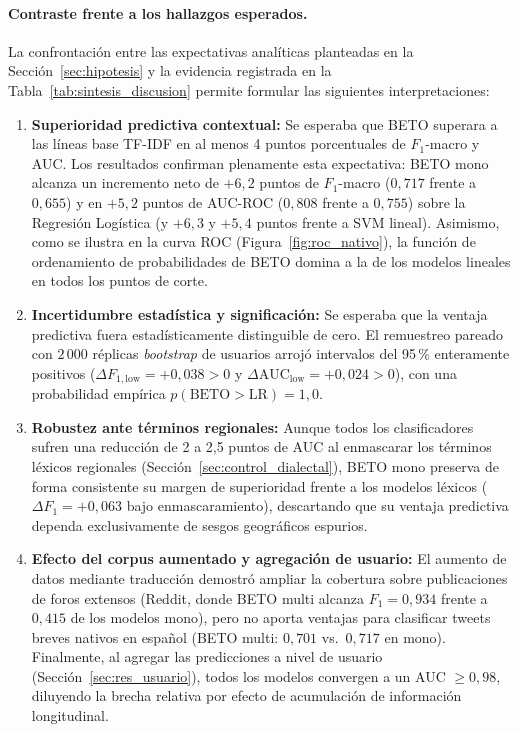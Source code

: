 \documentclass[12pt,a4paper]{article}
\begin{document}
\paragraph{Contraste frente a los hallazgos esperados.}
La confrontación entre las expectativas analíticas planteadas en la Sección~\ref{sec:hipotesis} y la evidencia registrada en la Tabla~\ref{tab:sintesis_discusion} permite formular las siguientes interpretaciones:
\begin{enumerate}[leftmargin=2em]
    \item \textbf{Superioridad predictiva contextual:} Se esperaba que BETO superara a las líneas base TF-IDF en al menos 4 puntos porcentuales de $F_1$-macro y AUC. Los resultados confirman plenamente esta expectativa: BETO mono alcanza un incremento neto de $+6{,}2$ puntos de $F_1$-macro ($0{,}717$ frente a $0{,}655$) y en $+5{,}2$ puntos de AUC-ROC ($0{,}808$ frente a $0{,}755$) sobre la Regresión Logística (y $+6{,}3$ y $+5{,}4$ puntos frente a SVM lineal). Asimismo, como se ilustra en la curva ROC (Figura~\ref{fig:roc_nativo}), la función de ordenamiento de probabilidades de BETO domina a la de los modelos lineales en todos los puntos de corte.
    \item \textbf{Incertidumbre estadística y significación:} Se esperaba que la ventaja predictiva fuera estadísticamente distinguible de cero. El remuestreo pareado con $2\,000$ réplicas \emph{bootstrap} de usuarios arrojó intervalos del 95\,\% enteramente positivos ($\Delta F_{1,\text{low}} = +0{,}038 > 0$ y $\Delta\text{AUC}_{\text{low}} = +0{,}024 > 0$), con una probabilidad empírica $p(\text{BETO} > \text{LR}) = 1{,}0$.
    \item \textbf{Robustez ante términos regionales:} Aunque todos los clasificadores sufren una reducción de 2 a 2{,}5 puntos de AUC al enmascarar los términos léxicos regionales (Sección~\ref{sec:control_dialectal}), BETO mono preserva de forma consistente su margen de superioridad frente a los modelos léxicos ($\Delta F_1 = +0{,}063$ bajo enmascaramiento), descartando que su ventaja predictiva dependa exclusivamente de sesgos geográficos espurios.
    \item \textbf{Efecto del corpus aumentado y agregación de usuario:} El aumento de datos mediante traducción demostró ampliar la cobertura sobre publicaciones de foros extensos (Reddit, donde BETO multi alcanza $F_1 = 0{,}934$ frente a $0{,}415$ de los modelos mono), pero no aporta ventajas para clasificar tweets breves nativos en español (BETO multi: $0{,}701$ vs.\ $0{,}717$ en mono). Finalmente, al agregar las predicciones a nivel de usuario (Sección~\ref{sec:res_usuario}), todos los modelos convergen a un AUC $\ge 0{,}98$, diluyendo la brecha relativa por efecto de acumulación de información longitudinal.
\end{enumerate}
\end{document}
